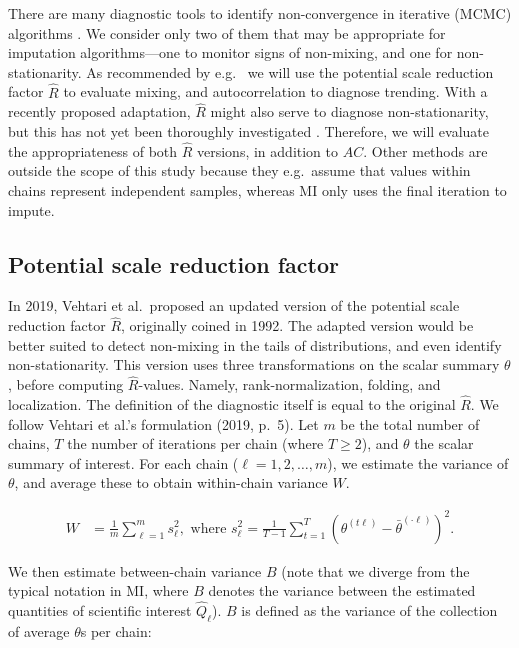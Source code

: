 \documentclass[Royal,times,sageh]{sagej}
\begin{document}
There are many diagnostic tools to identify non-convergence in iterative (MCMC) algorithms \citep{broo98, elad06}. We consider only two of them that may be appropriate for imputation algorithms---one to monitor signs of non-mixing, and one for non-stationarity. As recommended by e.g.~\citet{cowl96} we will use the potential scale reduction factor \(\widehat{R}\) \citep[`Gelman-Rubin statistic';][]{gelm92} to evaluate mixing, and autocorrelation \citep[\(AC\);][]{scha97, gelm13} to diagnose trending. With a recently proposed adaptation, \(\widehat{R}\) might also serve to diagnose non-stationarity, but this has not yet been thoroughly investigated \citep{veht19}. Therefore, we will evaluate the appropriateness of both \(\widehat{R}\) versions, in addition to \(AC\). Other methods are outside the scope of this study because they e.g.~assume that values within chains represent independent samples, whereas MI only uses the final iteration to impute.

\hypertarget{potential-scale-reduction-factor}{%
\subsection{Potential scale reduction factor}\label{potential-scale-reduction-factor}}

In 2019, Vehtari et al.~proposed an updated version of the potential scale reduction factor \(\widehat{R}\), originally coined in 1992. The adapted version would be better suited to detect non-mixing in the tails of distributions, and even identify non-stationarity. This version uses three transformations on the scalar summary \(\theta\), before computing \(\widehat{R}\)-values. Namely, rank-normalization, folding, and localization. The definition of the diagnostic itself is equal to the original \(\widehat{R}\). We follow Vehtari et al.'s formulation (2019, p.~5). Let \(m\) be the total number of chains, \(T\) the number of iterations per chain (where \(T\geq2\)), and \(\theta\) the scalar summary of interest. For each chain (\(\ell = 1, 2, \dots, m\)), we estimate the variance of \(\theta\), and average these to obtain within-chain variance \(W\).

\begin{align*}
W&=\frac{1}{m} \sum_{\ell=1}^{m} s_{\ell}^{2}, \text { where } s_{\ell}^{2}=\frac{1}{T-1} \sum_{t=1}^{T}\left(\theta^{(t \ell)}-\bar{\theta}^{(\cdot \ell)}\right)^{2}. 
\end{align*}

\noindent We then estimate between-chain variance \(B\) (note that we diverge from the typical notation in MI, where \(B\) denotes the variance between the estimated quantities of scientific interest \(\hat{Q}_{\ell}\)). \(B\) is defined as the variance of the collection of average \(\theta\)s per chain:
\end{document}
